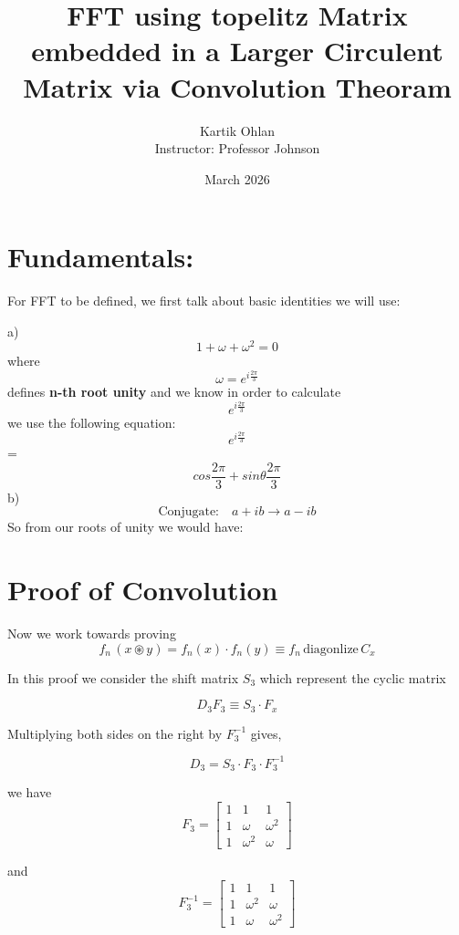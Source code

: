\documentclass{article}
\title{FFT using topelitz Matrix embedded in a Larger Circulent Matrix via Convolution Theoram}
\author{
Kartik Ohlan \\
Instructor: Professor Johnson
}
\date{March 2026}
\begin{document}
\maketitle

\section{Fundamentals:}

For FFT to be defined, we first talk about basic identities we will use:

a) $$1 + \omega + \omega^2 =0$$
    where $$\omega = e^{i\frac{2\pi}{3}}$$ defines \textbf{n-th root unity}
    and we know in order to calculate $$e^{i\frac{2\pi}{3}}$$ we use the following equation:
    $$e^{i\frac{2\pi}{3}}$$ = $$ cos \frac{2\pi}{3} + sin\theta \frac{2\pi}{3}$$
b)  \[
\text{Conjugate:} \quad a + ib \longrightarrow a - ib
\]
    So from our roots of unity we would have:


\section{Proof of Convolution}

Now we work towards proving \[f_n \, (x \circledast y) = f_n(x) \cdot f_n(y) \equiv f_n \, \text{diagonlize} \,  C_{x} \]

In this proof we consider the shift matrix $S_3$ which represent the cyclic matrix

\[D_3 F_3 \equiv  S_3 \cdot F_x\]

Multiplying both sides on the right by $F_3^{-1}$ gives,

\begin{center}
\begin{equation}
D_3 = S_3 \cdot F_3 \cdot F_3^{-1}
\label{eq:c3}
\end{equation}
\end{center}


we have \[F_3 = \begin{bmatrix} 1&1&1 \\ 1 & \omega & \omega^2  \\1 & \omega^2 & \omega \end{bmatrix}\] 

and \[F_3^{-1} = \begin{bmatrix} 1&1&1 \\ 1 & \omega^2 & \omega \\ 1 & \omega &     \omega^2 \end{bmatrix}\]
\end{document}
